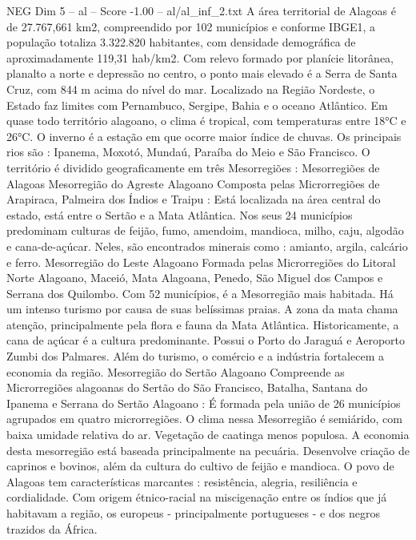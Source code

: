 \begin{textsample}{NEG Dim 5 – al – Score -1.00 – al/al\_inf\_2.txt}  \label{ex:f5_neg_245}
A área territorial de Alagoas é de 27.767,661 km2, compreendido por 102 municípios e conforme IBGE1, a população totaliza 3.322.820 habitantes, com densidade demográfica de aproximadamente 119,31 hab/km2.
Com relevo formado por planície litorânea, planalto a norte e depressão no centro, o ponto mais elevado é a Serra de Santa Cruz, com 844 m acima do nível do mar.
Localizado na Região Nordeste, o Estado faz limites com Pernambuco, Sergipe, Bahia e o oceano Atlântico.
Em quase todo território alagoano, o clima é tropical, com temperaturas entre 18{\EmojiFont °}C e 26{\EmojiFont °}C.
O inverno é a estação em que ocorre maior índice de chuvas.
Os principais rios são : Ipanema, Moxotó, Mundaú, Paraíba do Meio e São Francisco.
O território é dividido geograficamente em três Mesorregiões : Mesorregiões de Alagoas Mesorregião do Agreste Alagoano Composta pelas Microrregiões de Arapiraca, Palmeira dos Índios e Traipu : Está localizada na área central do estado, está entre o Sertão e a Mata Atlântica.
Nos seus 24 municípios predominam culturas de feijão, fumo, amendoim, mandioca, milho, caju, algodão e cana-de-açúcar.
Neles, são encontrados minerais como : amianto, argila, calcário e ferro.
Mesorregião do Leste Alagoano Formada pelas Microrregiões do Litoral Norte Alagoano, Maceió, Mata Alagoana, Penedo, São Miguel dos Campos e Serrana dos Quilombo.
Com 52 municípios, é a Mesorregião mais habitada.
Há um intenso turismo por causa de suas belíssimas praias.
A zona da mata chama atenção, principalmente pela flora e fauna da Mata Atlântica.
Historicamente, a cana de açúcar é a cultura predominante.
Possui o Porto do Jaraguá e Aeroporto Zumbi dos Palmares.
Além do turismo, o comércio e a indústria fortalecem a economia da região.
Mesorregião do Sertão Alagoano Compreende as Microrregiões alagoanas do Sertão do São Francisco, Batalha, Santana do Ipanema e Serrana do Sertão Alagoano : É formada pela união de 26 municípios agrupados em quatro microrregiões.
O clima nessa Mesorregião é semiárido, com baixa umidade relativa do ar.
Vegetação de caatinga menos populosa.
A economia desta mesorregião está baseada principalmente na pecuária.
Desenvolve criação de caprinos e bovinos, além da cultura do cultivo de feijão e mandioca.
O povo de Alagoas tem características marcantes : resistência, alegria, resiliência e cordialidade.
Com origem étnico-racial na miscigenação entre os índios que já habitavam a região, os europeus - principalmente portugueses - e dos negros trazidos da África.

\end{textsample}
